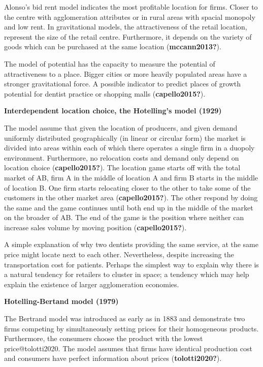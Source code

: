 \documentclass[
  10,
  a4paper,
]{article}
\begin{document}
Alonso's bid rent model indicates the most profitable location for
firms. Closer to the centre with agglomeration attributes or in rural
areas with spacial monopoly and low rent. In gravitational models, the
attractiveness of the retail location, represent the size of the retail
centre. Furthermore, it depends on the variety of goods which can be
purchased at the same location (\textbf{mccann2013?}).

The model of potential has the capacity to measure the potential of
attractiveness to a place. Bigger cities or more heavily populated areas
have a stronger gravitational force. A possible indicator to predict
places of growth potential for dentist practice or shopping malls
(\textbf{capello2015?}).

\textbf{Interdependent location choice, the Hotelling's model (1929)}

The model assume that given the location of producers, and given demand
uniformly distributed geographically (in linear or circular form) the
market is divided into areas within each of which there operates a
single firm in a duopoly environment. Furthermore, no relocation costs
and demand only depend on location choice (\textbf{capello2015?}). The
location game starts off with the total market of AB, firm A in the
middle of location A and firm B starts in the middle of location B. One
firm starts relocating closer to the other to take some of the customers
in the other market area (\textbf{capello2015?}). The other respond by
doing the same and the game continues until both end up in the middle of
the market on the broader of AB. The end of the game is the position
where neither can increase sales volume by moving position
(\textbf{capello2015?}).

A simple explanation of why two dentists providing the same service, at
the same price might locate next to each other. Nevertheless, despite
increasing the transportation cost for patients. Perhaps the simplest
way to explain why there is a natural tendency for retailers to cluster
in space; a tendency which may help explain the existence of larger
agglomeration economies.

\textbf{Hotelling-Bertand model (1979)}

The Bertrand model was introduced as early as in 1883 and demonstrate
two firms competing by simultaneously setting prices for their
homogeneous products. Furthermore, the consumers choose the product with
the lowest price@tolotti2020. The model assumes that firms have
identical production cost and consumers have perfect information about
prices (\textbf{tolotti2020?}).
\end{document}
